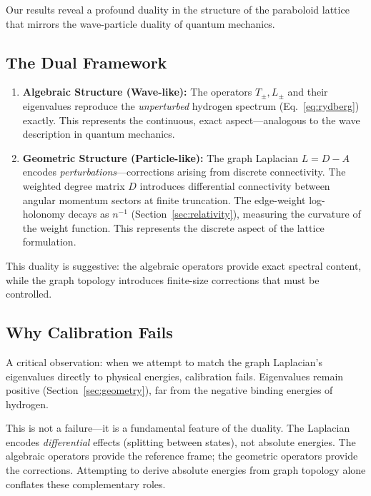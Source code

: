 \documentclass[aps,pra,twocolumn,superscriptaddress,longbibliography]{revtex4-2}
\begin{document}
Our results reveal a profound duality in the structure of the paraboloid lattice that mirrors the wave-particle duality of quantum mechanics.

\subsection{The Dual Framework}

\begin{enumerate}
\item \textbf{Algebraic Structure (Wave-like):} The operators $T_\pm, L_\pm$ and their eigenvalues reproduce the \textit{unperturbed} hydrogen spectrum (Eq.~\ref{eq:rydberg}) exactly. This represents the continuous, exact aspect---analogous to the wave description in quantum mechanics.

\item \textbf{Geometric Structure (Particle-like):} The graph Laplacian $L = D - A$ encodes \textit{perturbations}---corrections arising from discrete connectivity. The weighted degree matrix $D$ introduces differential connectivity between angular momentum sectors at finite truncation. The edge-weight log-holonomy decays as $n^{-1}$ (Section~\ref{sec:relativity}), measuring the curvature of the weight function. This represents the discrete aspect of the lattice formulation.
\end{enumerate}

This duality is suggestive: the algebraic operators provide exact spectral content, while the graph topology introduces finite-size corrections that must be controlled.

\subsection{Why Calibration Fails}

A critical observation: when we attempt to match the graph Laplacian's eigenvalues directly to physical energies, calibration fails. Eigenvalues remain positive (Section~\ref{sec:geometry}), far from the negative binding energies of hydrogen.

This is not a failure---it is a fundamental feature of the duality. The Laplacian encodes \textit{differential} effects (splitting between states), not absolute energies. The algebraic operators provide the reference frame; the geometric operators provide the corrections. Attempting to derive absolute energies from graph topology alone conflates these complementary roles.
\end{document}
